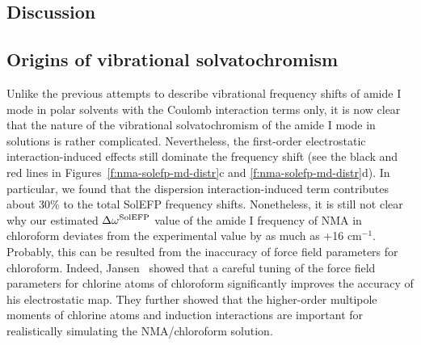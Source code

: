 \documentclass[a4paper,titlepage,twoside,fleqn,12pt]{book}
\begin{document}
\begin{refsection}
\section{Discussion}

\subsection{Origins of vibrational solvatochromism}

Unlike the previous attempts to describe vibrational
frequency shifts of amide I mode in polar solvents with the
Coulomb interaction terms only, it is now clear that the nature
of the vibrational solvatochromism of the amide I mode in
solutions is rather complicated. Nevertheless, the first\hyp{}order
electrostatic interaction\hyp{}induced effects still dominate the
frequency shift (see the black and red lines in Figures~\ref{f:nma-solefp-md-distr}c 
and \ref{f:nma-solefp-md-distr}d). 
In particular, we found that the dispersion interaction\hyp{}induced
term contributes about 30\% to the total SolEFP
frequency shifts. Nonetheless, it is still not clear why our
estimated $\Delta\omega^{\rm SolEFP}$ value of the amide I frequency of NMA in
chloroform deviates from the experimental value by as much
as +16 cm$^{-1}$. Probably, this can be resulted from the inaccuracy
of force field parameters for chloroform. Indeed, Jansen~\citep{Jansen.JPCB.2014}
showed that a careful tuning of the force field parameters
for chlorine atoms of chloroform significantly improves the
accuracy of his electrostatic map. They further showed that
the higher\hyp{}order multipole moments of chlorine atoms and
induction interactions are important for realistically simulating
the NMA/chloroform solution.


\end{refsection}
\end{document}
